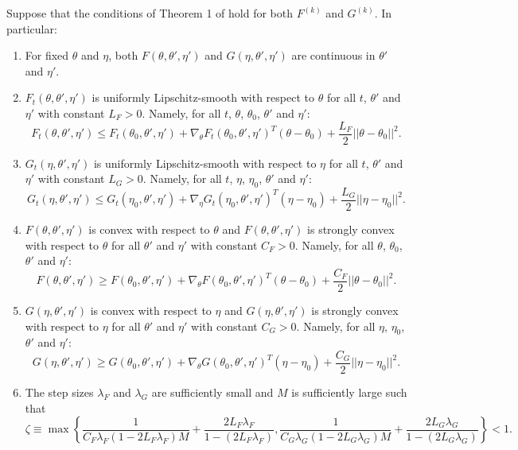     
\begin{theorem}

    Suppose that the conditions of Theorem 1 of \citet{Johnson:2013} hold for both $F^{(k)}$ and $G^{(k)}$. In particular:
    
    \begin{enumerate}
        \item For fixed $\theta$ and $\eta$, both $F(\theta,\theta',\eta')$ and $G(\eta,\theta',\eta')$ are continuous in $\theta'$ and $\eta'.$
        \item $F_t(\theta,\theta',\eta')$ is uniformly Lipschitz-smooth with respect to $\theta$ for all $t$, $\theta'$ and $\eta'$ with constant $L_F > 0$. Namely, for all $t$, $\theta$, $\theta_0$, $\theta'$ and $\eta'$:
        $$F_t(\theta, \theta', \eta') \leq F_t(\theta_0,\theta',  \eta') + \nabla_\theta F_t(\theta_0, \theta',  \eta')^T(\theta-\theta_0) + \frac{L_F}{2} ||\theta - \theta_0||^2.$$ 
        \item $G_t(\eta,\theta',\eta')$ is uniformly Lipschitz-smooth with respect to $\eta$ for all $t$, $\theta'$ and $\eta'$ with constant $L_G > 0$. Namely, for all $t$, $\eta$, $\eta_0$, $\theta'$ and $\eta'$:
        $$G_t(\eta, \theta',  \eta') \leq G_t(\eta_0,\theta',  \eta') + \nabla_\eta G_t(\eta_0,\theta',  \eta')^T(\eta-\eta_0) + \frac{L_G}{2} ||\eta - \eta_0||^2.$$
        \item $F(\theta,\theta',\eta')$ is convex with respect to $\theta$ and $F(\theta,\theta',\eta')$ is strongly convex with respect to $\theta$ for all $\theta'$ and $\eta'$ with constant $C_F > 0$. Namely, for all $\theta$, $\theta_0$, $\theta'$ and $\eta'$:
        $$F(\theta, \theta', \eta') \geq F(\theta_0,\theta',  \eta') + \nabla_\theta F(\theta_0, \theta',  \eta')^T(\theta-\theta_0) + \frac{C_F}{2} ||\theta - \theta_0||^2.$$ 
        \item $G(\eta,\theta',\eta')$ is convex with respect to $\eta$ and $G(\eta,\theta',\eta')$ is strongly convex with respect to $\eta$ for all $\theta'$ and $\eta'$ with constant $C_G > 0$. Namely, for all $\eta$, $\eta_0$, $\theta'$ and $\eta'$:
        $$G(\eta, \theta', \eta') \geq G(\theta_0,\theta',\eta') + \nabla_\theta G(\theta_0, \theta', \eta')^T (\eta-\eta_0) + \frac{C_G}{2} ||\eta - \eta_0||^2.$$ 
        \item The step sizes $\lambda_F$ and $\lambda_G$ are sufficiently small and $M$ is sufficiently large such that 
        $$\zeta \equiv \max \left\{\frac{1}{C_F \lambda_F(1-2L_F\lambda_F)M} + \frac{2L_F\lambda_F}{1-(2L_F\lambda_F)}, \frac{1}{C_G \lambda_G(1-2L_G\lambda_G)M} + \frac{2L_G\lambda_G}{1-(2L_G\lambda_G)}\right\} < 1.$$
    \end{enumerate}


\end{theorem}
